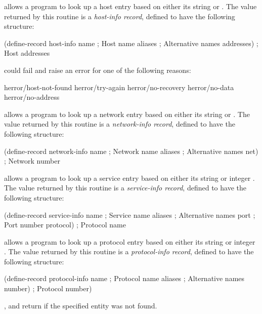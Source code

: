 \begin{desc}

 allows a program to look up a host entry based on either
its string  or . The value returned by this
routine is a \emph{host-info record}, defined to have the following
structure:
\begin{code}
(define-record host-info
  name                                  ; Host name
  aliases                               ; Alternative names
  addresses)                            ; Host addresses\end{code}

 could fail and raise an error for one of the following
reasons: 
\begin{code}\codeallowbreaks
herror/host-not-found
herror/try-again
herror/no-recovery
herror/no-data
herror/no-address\end{code}

 allows a program to look up a network entry based on either
its string  or . The value returned by this
routine is a \emph{network-info record}, defined to have the following
structure:
\begin{code}
(define-record network-info
  name                                  ; Network name
  aliases                               ; Alternative names
  net)                                  ; Network number\end{code}

 allows a program to look up a service entry based
on either its string  or integer . The value returned
by this routine is a \emph{service-info record}, defined to have the
following structure:
\begin{code}
(define-record service-info
  name                                  ; Service name
  aliases                               ; Alternative names
  port                                  ; Port number
  protocol)                             ; Protocol name\end{code}

 allows a program to look up a protocol entry based
on either its string  or integer . The value returned
by this routine is a \emph{protocol-info record}, defined to have the
following structure:
\begin{code}
(define-record protocol-info
  name                                  ; Protocol name
  aliases                               ; Alternative names
  number)                               ; Protocol number)\end{code}

,  and  return
\sharpf if the specified entity was not found.

\end{desc}
